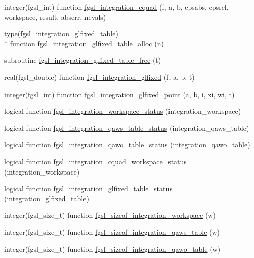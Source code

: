 \begin{DoxyCompactItemize}
\item 
integer(fgsl\-\_\-int) function \hyperlink{integration_8finc_a1ffbbe565fc03775fe50c3c2d9150c05}{fgsl\-\_\-integration\-\_\-cquad} (f, a, b, epsabs, epsrel, workspace, result, abserr, nevals)
\item 
type(fgsl\-\_\-integration\-\_\-glfixed\-\_\-table) \\*
function \hyperlink{integration_8finc_a0372516d9af16579e899b6e836da0890}{fgsl\-\_\-integration\-\_\-glfixed\-\_\-table\-\_\-alloc} (n)
\item 
subroutine \hyperlink{integration_8finc_a77c5cbd4335b0305ecd0b6d3a573a309}{fgsl\-\_\-integration\-\_\-glfixed\-\_\-table\-\_\-free} (t)
\item 
real(fgsl\-\_\-double) function \hyperlink{integration_8finc_a1382e36b9f130563b7df1e1b339f3e8d}{fgsl\-\_\-integration\-\_\-glfixed} (f, a, b, t)
\item 
integer(fgsl\-\_\-int) function \hyperlink{integration_8finc_a64e8396fde2c4a8a76192ed6650977f3}{fgsl\-\_\-integration\-\_\-glfixed\-\_\-point} (a, b, i, xi, wi, t)
\item 
logical function \hyperlink{integration_8finc_a42978e91589d08c3af524cec986ce33c}{fgsl\-\_\-integration\-\_\-workspace\-\_\-status} (integration\-\_\-workspace)
\item 
logical function \hyperlink{integration_8finc_a5da0a8440c5f23a14f8b22c5fefb5404}{fgsl\-\_\-integration\-\_\-qaws\-\_\-table\-\_\-status} (integration\-\_\-qaws\-\_\-table)
\item 
logical function \hyperlink{integration_8finc_aa91a1f90a0f43067989a90e651f53dcb}{fgsl\-\_\-integration\-\_\-qawo\-\_\-table\-\_\-status} (integration\-\_\-qawo\-\_\-table)
\item 
logical function \hyperlink{integration_8finc_a1dcdd67510034ad4aa4c3396fe600818}{fgsl\-\_\-integration\-\_\-cquad\-\_\-workspace\-\_\-status} (integration\-\_\-workspace)
\item 
logical function \hyperlink{integration_8finc_a0cfbd26bc06d3740a8f2ed7821fd958f}{fgsl\-\_\-integration\-\_\-glfixed\-\_\-table\-\_\-status} (integration\-\_\-glfixed\-\_\-table)
\item 
integer(fgsl\-\_\-size\-\_\-t) function \hyperlink{integration_8finc_a25f1356cc9307dc2a56993d387fd9460}{fgsl\-\_\-sizeof\-\_\-integration\-\_\-workspace} (w)
\item 
integer(fgsl\-\_\-size\-\_\-t) function \hyperlink{integration_8finc_a78bc5e30c21dd07ef8c02d6674127ad4}{fgsl\-\_\-sizeof\-\_\-integration\-\_\-qaws\-\_\-table} (w)
\item 
integer(fgsl\-\_\-size\-\_\-t) function \hyperlink{integration_8finc_a8690a1322fb1d8384361ef19dac3483d}{fgsl\-\_\-sizeof\-\_\-integration\-\_\-qawo\-\_\-table} (w)
\end{DoxyCompactItemize}



